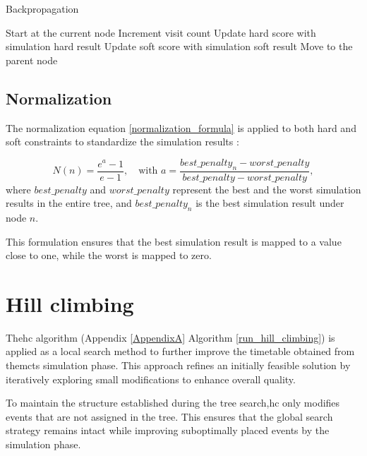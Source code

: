 \begin{algorithm}
\caption{Backpropagation}\label{backpropagation}
\begin{algorithmic}[1]
    \State Start at the current node
        \State Increment visit count
        \State Update hard score with simulation hard result
        \State Update soft score with simulation soft result
        \State Move to the parent node
    \EndWhile
\EndProcedure
\end{algorithmic}
\end{algorithm}

\subsection{Normalization}\label{sec:normalization}

The normalization equation \ref{normalization_formula} is applied to both hard and soft constraints to standardize the simulation results \cite{pedroso_tree_2015}:

\begin{equation}
N(n) = \frac{e^a - 1}{e - 1}, \quad \text{with } a = \frac{best\_penalty_n - worst\_penalty}{best\_penalty - worst\_penalty},\label{normalization_formula}
\end{equation}
where \(best\_penalty\) and \(worst\_penalty\) represent the best and the worst simulation results in the entire tree, and \(best\_penalty_n\) is the best simulation result under node \(n\).

This formulation ensures that the best simulation result is mapped to a value close to one, while the worst is mapped to zero.

\section{Hill climbing}\label{hill_climbing_section}

The\ac{hc} algorithm (Appendix \ref{AppendixA} Algorithm \ref{run_hill_climbing}) is applied as a local search method to further improve the timetable obtained from the\ac{mcts} simulation phase. This approach refines an initially feasible solution by iteratively exploring small modifications to enhance overall quality.

To maintain the structure established during the tree search,\ac{hc} only modifies events that are not assigned in the tree. This ensures that the global search strategy remains intact while improving suboptimally placed events by the simulation phase.

